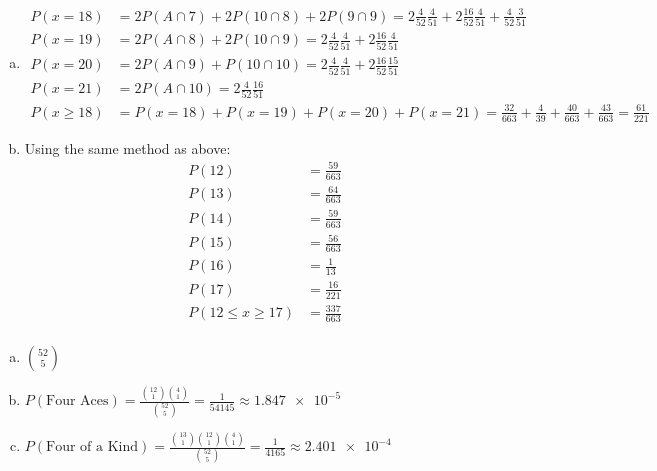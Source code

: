 \documentclass[12pt]{article}
\newenvironment{problem}[2][Problem]{\begin{trivlist}
\item[\hskip \labelsep {\bfseries #1}\hskip \labelsep {\bfseries #2.}]
  \vspace{1 cm}
}{\end{trivlist}}
\begin{document}
\begin{problem}{2.41}
 \item
   \begin{enumerate}[a.]
    \item %
      \begin{align*}
              P(x = 18) &= 2P(A\cap7) + 2P(10\cap8) + 2P(9\cap9) 
              = 2\frac{4}{52}\frac{4}{51} + 2\frac{16}{52}\frac{4}{51} + \frac{4}{52}\frac{3}{51} \\
              P(x = 19) &= 2P(A\cap8) + 2P(10\cap9) 
              = 2\frac{4}{52}\frac{4}{51} + 2\frac{16}{52}\frac{4}{51} \\
              P(x = 20) &= 2P(A\cap9) + P(10\cap10) 
              = 2\frac{4}{52}\frac{4}{51} + 2\frac{16}{52}\frac{15}{51} \\ 
              P(x = 21) &= 2P(A\cap10) 
              = 2\frac{4}{52}\frac{16}{51} \\ 
              P(x \geq 18) &= P(x = 18) + P(x = 19) + P(x = 20) + P(x = 21)
              = \frac{32}{663} +\frac{4}{39} +\frac{40}{663} +\frac{43}{663} 
              = \frac{61}{221}
      \end{align*}
    \item %
      Using the same method as above:
      \begin{align*}
        P(12) &= \frac{59}{663}\\
        P(13) &= \frac{64}{663}\\
        P(14) &= \frac{59}{663}\\
        P(15) &= \frac{56}{663}\\
        P(16) &= \frac{1}{13}\\
        P(17) &= \frac{16}{221}\\
        P(12 \leq x \geq 17) &= \frac{337}{663}\\
      \end{align*}
  \end{enumerate}
\end{problem}

\begin{problem}{2.43}
\item
  \begin{enumerate}[a.]
    \item %
      $\binom{52}{5}$
    \item %
      $P(\textrm{Four Aces}) 
      = \frac{\binom{12}{1}\binom{4}{1}}{\binom{52}{5}}
      = \frac{1}{54145} \approx \num{1.847e-5}$
    \item %
      $P(\textrm{Four of a Kind}) 
      = \frac{ \binom{13}{1} \binom{12}{1} \binom{4}{1}}{\binom{52}{5}}
      = \frac{1}{4165} \approx \num{2.401e-4}$
  \end{enumerate}
\end{problem}
\end{document}
